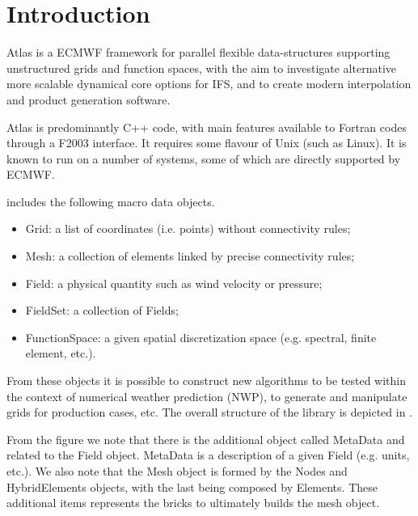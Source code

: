 \chapter{Introduction}
Atlas is a ECMWF framework for parallel flexible data-structures 
supporting unstructured grids and function spaces, with the aim 
to investigate alternative more scalable dynamical core options 
for IFS, and to create modern interpolation and product generation 
software.

Atlas is predominantly C++ code, with main features available 
to Fortran codes through a F2003 interface. It requires some 
flavour of Unix (such as Linux). It is known to run on a number 
of systems, some of which are directly supported by ECMWF.

\Atlas includes the following macro data objects.
%
\begin{itemize}
\item Grid: a list of coordinates (i.e. points) without connectivity 
rules;
\item Mesh: a collection of elements linked by precise connectivity 
rules;
\item Field: a physical quantity such as wind velocity or pressure;
\item FieldSet: a collection of Fields;
\item FunctionSpace: a given spatial discretization space (e.g. spectral, 
finite element, etc.).
\end{itemize}
%
From these objects it is possible to construct new algorithms 
to be tested within the context of numerical weather prediction 
(NWP), to generate and manipulate grids for production 
cases, etc. The overall structure of the library is depicted 
in .

From the figure we note that there is the additional object 
called MetaData and related to the Field object. MetaData 
is a description of a given Field (e.g. units, etc.).
We also note that the Mesh object is formed by the Nodes 
and HybridElements objects, with the last being composed 
by Elements. These additional items represents the bricks 
to ultimately builds the mesh object.
 

